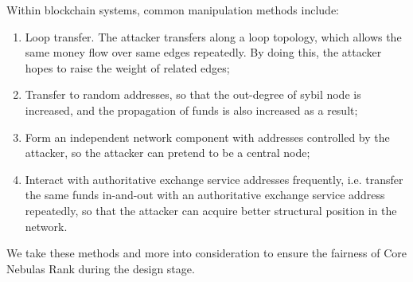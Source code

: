Within blockchain systems, common manipulation methods include:
\begin{enumerate}
\item Loop transfer. The attacker transfers along a loop topology, which allows the same money flow over same edges repeatedly. By doing this, the attacker hopes to raise the weight of related edges;
\item Transfer to random addresses, so that the out-degree of sybil node is increased, and the propagation of funds is also increased as a result;
\item Form an independent network component with addresses controlled by the attacker, so the attacker can pretend to be a central node;
\item Interact with authoritative exchange service addresses frequently, i.e. transfer the same funds in-and-out with an authoritative exchange service address repeatedly, so that the attacker can acquire better structural position in the network.
\end{enumerate}

We take these methods and more into consideration to ensure the fairness of Core Nebulas Rank during the design stage.

